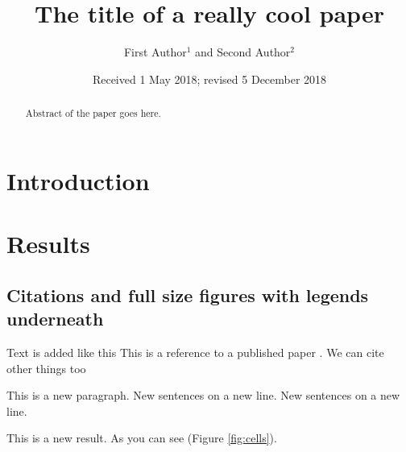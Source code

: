 \documentclass[vruler,JCS]{COB}
\begin{document}

\title{The title of a really cool paper}

\author{First Author$^{1}$ and Second Author$^{2}$}

\address{
}


\date{Received 1 May 2018; revised 5 December 2018}

\maketitle

\begin{abstract}
Abstract of the paper goes here.
\lipsum[1]
\end{abstract}


\section{Introduction}\label{s:introduction}

\lipsum[2-8]


\section{Results}\label{s:results}

\subsection{Citations and full size figures with legends underneath}

Text is added like this
This is a reference to a published paper \citep{watson_molecular_1953}.
We can cite other things too \citep{tipton_complexities_2019,zheng_genome_2011,alberts_molecular_2002}

This is a new paragraph.
New sentences on a new line.
New sentences on a new line.

This is a new result.
As you can see (Figure \ref{fig:cells}).
\end{document}
